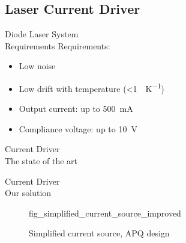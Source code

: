 \documentclass[color={accentcolor=1b}, authorontitle=true]{tudabeamer}
\begin{document}
\subsection{Laser Current Driver}
\begin{frame}{Diode Laser System\\\textnormal{\small{Requirements}}}
    Requirements:
    \begin{itemize}
        \item Low noise
        \item Low drift with temperature (\qty{<1}{\ppm \per \kelvin})
        \item Output current: up to \qty{500}{\mA}
        \item Compliance voltage: up to \qty{10}{\V}
    \end{itemize}

\end{frame}

\begin{frame}{Current Driver\\\textnormal{\small{The state of the art}}}
    \begin{figure}
    \end{figure}
\end{frame}

\begin{frame}{Current Driver\\\textnormal{\small{Our solution}}}
    \begin{figure}
        {fig_simplified_current_source_improved}
        \caption{Simplified current source, APQ design}
    \end{figure}
\end{frame}
\end{document}
